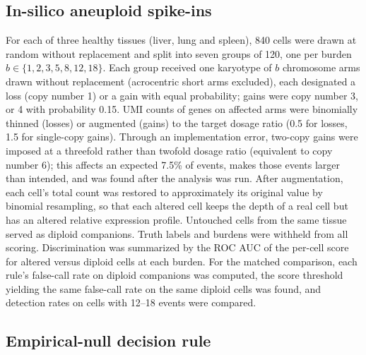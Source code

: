 \documentclass[11pt,letterpaper]{article}
\begin{document}
\subsection{In-silico aneuploid spike-ins}

For each of three healthy tissues (liver, lung and spleen), 840 cells were drawn at random without replacement and split into seven groups of 120, one per burden $b \in \{1, 2, 3, 5, 8, 12, 18\}$. Each group received one karyotype of $b$ chromosome arms drawn without replacement (acrocentric short arms excluded), each designated a loss (copy number 1) or a gain with equal probability; gains were copy number 3, or 4 with probability 0.15. UMI counts of genes on affected arms were binomially thinned (losses) or augmented (gains) to the target dosage ratio (0.5 for losses, 1.5 for single-copy gains). Through an implementation error, two-copy gains were imposed at a threefold rather than twofold dosage ratio (equivalent to copy number 6); this affects an expected 7.5\% of events, makes those events larger than intended, and was found after the analysis was run. After augmentation, each cell's total count was restored to approximately its original value by binomial resampling, so that each altered cell keeps the depth of a real cell but has an altered relative expression profile. Untouched cells from the same tissue served as diploid companions. Truth labels and burdens were withheld from all scoring. Discrimination was summarized by the ROC AUC of the per-cell score for altered versus diploid cells at each burden. For the matched comparison, each rule's false-call rate on diploid companions was computed, the score threshold yielding the same false-call rate on the same diploid cells was found, and detection rates on cells with 12--18 events were compared.

\subsection{Empirical-null decision rule}
\end{document}
